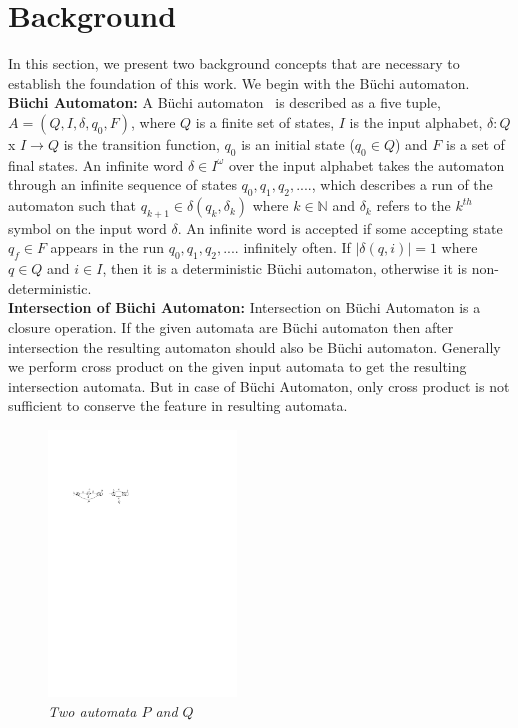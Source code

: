 \section{Background} \label{sec2}
\noindent
In this section, we present two background concepts that are necessary to establish the foundation of this work. We begin with the  
B\"{u}chi automaton. \\

\noindent
\textbf{B\"{u}chi Automaton:}
A B\"{u}chi automaton~\cite{leeuwen90/Thomas90} is described as a five tuple, 
$A = (Q,I,\delta,q_0,F)$, where $Q$ is a finite set of states, $I$ is the input alphabet, $\delta : Q$ x $I \rightarrow Q $ is the transition function, $q_0$ 
is an initial state ($q_0 \in Q$) and $F$ is a set of final states. An infinite word $\delta \in I ^ \omega$ over the input alphabet takes the automaton through an infinite sequence of states $ q_0, q_1, q_2, ....$, which describes a run of
the automaton such that $ q_{k+1} \in \delta(q_k, \delta_k)$ where $k \in \mathbb{N}$ and $\delta_k$ refers to the $k^{th}$ symbol on the input 
word $\delta$. An infinite word is accepted if some 
accepting state $q_f \in F $ appears in the run $ q_0, q_1, q_2, ....$ 
infinitely often. If 
$|\delta(q,i)| = 1$ where $ q \in Q $ and $i \in I$, then it is a deterministic 
B\"{u}chi automaton, otherwise it is non-deterministic. \\

\noindent
\textbf{Intersection of B\"{u}chi Automaton:}
Intersection on B\"{u}chi Automaton is a closure operation. If the given automata 
are B\"{u}chi automaton then after intersection the resulting automaton should also be 
B\"{u}chi automaton. Generally we perform cross product on the given input automata
to get the resulting intersection automata. But in case of B\"{u}chi Automaton, only cross product 
is not sufficient to conserve the feature in resulting automata.
\begin{figure}
\begin{center}
\includegraphics[width=50mm]{example_1.pdf}
\end{center}
\caption{{\em Two  automata $P$ and $Q$}}
\label{control_automata}
\end{figure}

